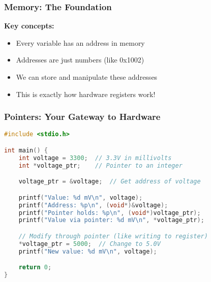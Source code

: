 \documentclass{beamer}
\begin{document}
\begin{frame}
\frametitle{Memory: The Foundation}
\begin{center}
\end{center}

\textbf{Key concepts:}
\begin{itemize}
    \item Every variable has an address in memory
    \item Addresses are just numbers (like 0x1002)
    \item We can store and manipulate these addresses
    \item This is exactly how hardware registers work!
\end{itemize}
\end{frame}

\begin{frame}[fragile]
\frametitle{Pointers: Your Gateway to Hardware}
\begin{lstlisting}[language=C]
#include <stdio.h>

int main() {
    int voltage = 3300;  // 3.3V in millivolts
    int *voltage_ptr;    // Pointer to an integer

    voltage_ptr = &voltage;  // Get address of voltage

    printf("Value: %d mV\n", voltage);
    printf("Address: %p\n", (void*)&voltage);
    printf("Pointer holds: %p\n", (void*)voltage_ptr);
    printf("Value via pointer: %d mV\n", *voltage_ptr);

    // Modify through pointer (like writing to register)
    *voltage_ptr = 5000;  // Change to 5.0V
    printf("New value: %d mV\n", voltage);

    return 0;
}
\end{lstlisting}
\end{frame}
\end{document}
